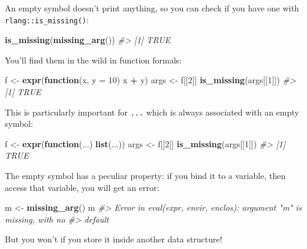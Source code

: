 \documentclass[]{book}
\newenvironment{Shaded}{\begin{snugshade}}{\end{snugshade}}
\newcommand{\CommentTok}[1]{\textcolor[rgb]{0.37,0.37,0.37}{\textit{#1}}}
\newcommand{\ControlFlowTok}[1]{\textcolor[rgb]{0.27,0.27,0.27}{\textbf{#1}}}
\newcommand{\DataTypeTok}[1]{\textcolor[rgb]{0.27,0.27,0.27}{#1}}
\newcommand{\DecValTok}[1]{\textcolor[rgb]{0.06,0.06,0.06}{#1}}
\newcommand{\KeywordTok}[1]{\textcolor[rgb]{0.27,0.27,0.27}{\textbf{#1}}}
\newcommand{\NormalTok}[1]{#1}
\newcommand{\OperatorTok}[1]{\textcolor[rgb]{0.43,0.43,0.43}{\textbf{#1}}}
\newcommand{\StringTok}[1]{\textcolor[rgb]{0.5,0.5,0.5}{#1}}
\begin{document}
An empty symbol doesn't print anything, so you can check if you have one with \texttt{rlang::is\_missing()}:

\begin{Shaded}
\begin{Highlighting}[]
\KeywordTok{is_missing}\NormalTok{(}\KeywordTok{missing_arg}\NormalTok{())}
\CommentTok{#> [1] TRUE}
\end{Highlighting}
\end{Shaded}

You'll find them in the wild in function formals:

\begin{Shaded}
\begin{Highlighting}[]
\NormalTok{f <-}\StringTok{ }\KeywordTok{expr}\NormalTok{(}\ControlFlowTok{function}\NormalTok{(x, }\DataTypeTok{y =} \DecValTok{10}\NormalTok{) x }\OperatorTok{+}\StringTok{ }\NormalTok{y)}
\NormalTok{args <-}\StringTok{ }\NormalTok{f[[}\DecValTok{2}\NormalTok{]]}
\KeywordTok{is_missing}\NormalTok{(args[[}\DecValTok{1}\NormalTok{]])}
\CommentTok{#> [1] TRUE}
\end{Highlighting}
\end{Shaded}

This is particularly important for \texttt{...} which is always associated with an empty symbol:

\begin{Shaded}
\begin{Highlighting}[]
\NormalTok{f <-}\StringTok{ }\KeywordTok{expr}\NormalTok{(}\ControlFlowTok{function}\NormalTok{(...) }\KeywordTok{list}\NormalTok{(...))}
\NormalTok{args <-}\StringTok{ }\NormalTok{f[[}\DecValTok{2}\NormalTok{]]}
\KeywordTok{is_missing}\NormalTok{(args[[}\DecValTok{1}\NormalTok{]])}
\CommentTok{#> [1] TRUE}
\end{Highlighting}
\end{Shaded}

The empty symbol has a peculiar property: if you bind it to a variable, then access that variable, you will get an error:

\begin{Shaded}
\begin{Highlighting}[]
\NormalTok{m <-}\StringTok{ }\KeywordTok{missing_arg}\NormalTok{()}
\NormalTok{m}
\CommentTok{#> Error in eval(expr, envir, enclos): argument "m" is missing, with no}
\CommentTok{#> default}
\end{Highlighting}
\end{Shaded}

But you won't if you store it inside another data structure!
\end{document}
